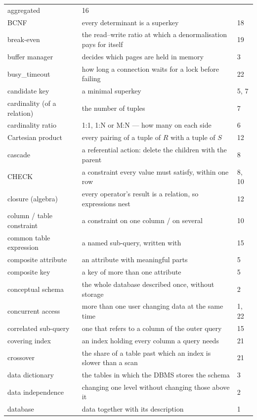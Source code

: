 \begin{longtable}{@{}L{3.9cm}L{8.9cm}R{1.2cm}@{}}
  aggregated & 16 \\
BCNF & every determinant is a superkey & 18 \\
break-even & the read--write ratio at which a denormalisation pays for itself
  & 19 \\
buffer manager & decides which pages are held in memory & 3 \\
busy\_timeout & how long a connection waits for a lock before failing & 22 \\
candidate key & a minimal superkey & 5, 7 \\
cardinality (of a relation) & the number of tuples & 7 \\
cardinality ratio & 1:1, 1:N or M:N --- how many on each side & 6 \\
Cartesian product & every pairing of a tuple of $R$ with a tuple of $S$ & 12 \\
cascade & a referential action: delete the children with the parent & 8 \\
CHECK & a constraint every value must satisfy, within one row & 8, 10 \\
closure (algebra) & every operator's result is a relation, so expressions nest
  & 12 \\
column / table constraint & a constraint on one column / on several & 10 \\
common table expression & a named sub-query, written with  & 15 \\
composite attribute & an attribute with meaningful parts & 5 \\
composite key & a key of more than one attribute & 5 \\
conceptual schema & the whole database described once, without storage & 2 \\
concurrent access & more than one user changing data at the same time & 1, 22 \\
correlated sub-query & one that refers to a column of the outer query & 15 \\
covering index & an index holding every column a query needs & 21 \\
crossover & the share of a table past which an index is slower than a scan &
  21 \\
data dictionary & the tables in which the DBMS stores the schema & 3 \\
data independence & changing one level without changing those above it & 2 \\
database & data together with its description & 1 \\

\end{longtable}

